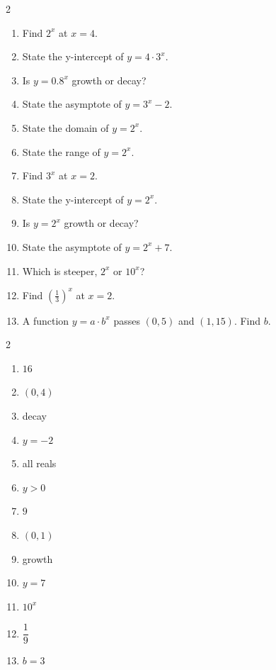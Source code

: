 \documentclass[11pt]{article}
\begin{document}
\begin{recapbox}
\begin{multicols}{2}
\small
\begin{enumerate}[leftmargin=*,itemsep=3pt]
  \item Find $2^x$ at $x=4$.
  \item State the y-intercept of $y=4\cdot3^x$.
  \item Is $y=0.8^x$ growth or decay?
  \item State the asymptote of $y=3^x-2$.
  \item State the domain of $y=2^x$.
  \item State the range of $y=2^x$.
  \item Find $3^x$ at $x=2$.
  \item State the y-intercept of $y=2^x$.
  \item Is $y=2^x$ growth or decay?
  \item State the asymptote of $y=2^x+7$.
  \item Which is steeper, $2^x$ or $10^x$?
  \item Find $\left(\tfrac13\right)^x$ at $x=2$.
  \item A function $y=a\cdot b^x$ passes $(0,5)$ and $(1,15)$. Find $b$.
\end{enumerate}
\end{multicols}
\end{recapbox}

\begin{keybox}
\begin{multicols}{2}
\small
\begin{enumerate}[leftmargin=*,itemsep=3pt]
  \item $16$
  \item $(0,4)$
  \item decay
  \item $y=-2$
  \item all reals
  \item $y>0$
  \item $9$
  \item $(0,1)$
  \item growth
  \item $y=7$
  \item $10^x$
  \item $\dfrac19$
  \item $b=3$
\end{enumerate}
\end{multicols}
\end{keybox}
\end{document}
